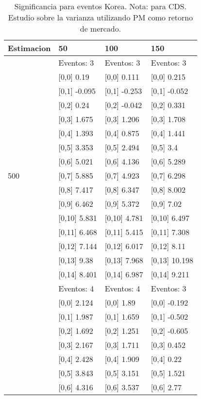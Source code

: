 \begin{table}

\caption{Significancia para eventos Korea. Nota: para CDS. Estudio sobre la varianza utilizando PM como retorno de mercado.}
\centering
\begin{tabular}[t]{llll}
\toprule
Estimacion & 50 & 100 & 150\\
\midrule
 & Eventos:  3 & Eventos:  3 & Eventos:  3\\
 & {}[0,0] 0.19 & {}[0,0] 0.111 & {}[0,0] 0.215\\
 & {}[0,1] -0.095 & {}[0,1] -0.253 & {}[0,1] -0.052\\
 & {}[0,2] 0.24 & {}[0,2] -0.042 & {}[0,2] 0.331\\
 & {}[0,3] 1.675 & {}[0,3] 1.206 & {}[0,3] 1.708\\
\addlinespace
 & {}[0,4] 1.393 & {}[0,4] 0.875 & {}[0,4] 1.441\\
 & {}[0,5] 3.353 & {}[0,5] 2.494 & {}[0,5] 3.4\\
 & {}[0,6] 5.021 & {}[0,6] 4.136 & {}[0,6] 5.289\\
500 & {}[0,7] 5.885 & {}[0,7] 4.923 & {}[0,7] 6.298\\
 & {}[0,8] 7.417 & {}[0,8] 6.347 & {}[0,8] 8.002\\
\addlinespace
 & {}[0,9] 6.462 & {}[0,9] 5.372 & {}[0,9] 7.02\\
 & {}[0,10] 5.831 & {}[0,10] 4.781 & {}[0,10] 6.497\\
 & {}[0,11] 6.468 & {}[0,11] 5.415 & {}[0,11] 7.308\\
 & {}[0,12] 7.144 & {}[0,12] 6.017 & {}[0,12] 8.11\\
 & {}[0,13] 9.38 & {}[0,13] 7.968 & {}[0,13] 10.198\\
\addlinespace
 & {}[0,14] 8.401 & {}[0,14] 6.987 & {}[0,14] 9.211\\
 & Eventos:  4 & Eventos:  4 & Eventos:  3\\
 & {}[0,0] 2.124 & {}[0,0] 1.89 & {}[0,0] -0.192\\
 & {}[0,1] 1.987 & {}[0,1] 1.659 & {}[0,1] -0.502\\
 & {}[0,2] 1.692 & {}[0,2] 1.251 & {}[0,2] -0.605\\
\addlinespace
 & {}[0,3] 2.167 & {}[0,3] 1.711 & {}[0,3] 0.452\\
 & {}[0,4] 2.428 & {}[0,4] 1.909 & {}[0,4] 0.22\\
 & {}[0,5] 3.843 & {}[0,5] 3.151 & {}[0,5] 1.521\\
 & {}[0,6] 4.316 & {}[0,6] 3.537 & {}[0,6] 2.77\\

\end{tabular}
\end{table}
